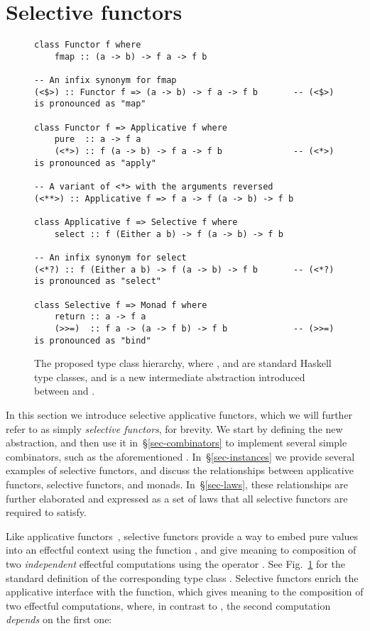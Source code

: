 \section{Selective functors}\label{sec-selective}

\begin{figure}
\begin{verbatim}
class Functor f where
    fmap :: (a -> b) -> f a -> f b

-- An infix synonym for fmap
(<$>) :: Functor f => (a -> b) -> f a -> f b       -- (<$>) is pronounced as "map"

class Functor f => Applicative f where
    pure  :: a -> f a
    (<*>) :: f (a -> b) -> f a -> f b              -- (<*>) is pronounced as "apply"

-- A variant of <*> with the arguments reversed
(<**>) :: Applicative f => f a -> f (a -> b) -> f b

class Applicative f => Selective f where
    select :: f (Either a b) -> f (a -> b) -> f b

-- An infix synonym for select
(<*?) :: f (Either a b) -> f (a -> b) -> f b       -- (<*?) is pronounced as "select"

class Selective f => Monad f where
    return :: a -> f a
    (>>=)  :: f a -> (a -> f b) -> f b             -- (>>=) is pronounced as "bind"
\end{verbatim}
\caption{The proposed type class hierarchy, where , 
and  are standard Haskell type classes, and  is
a new intermediate abstraction introduced between  and
.}\label{fig-types}
\end{figure}

In this section we introduce selective applicative functors, which we will
further refer to as simply \emph{selective functors}, for brevity. We start by
defining the new abstraction, and then use it in~\S\ref{sec-combinators} to
implement several simple combinators, such as the aforementioned .
In~\S\ref{sec-instances} we provide several examples of selective functors, and
discuss the relationships between applicative functors, selective functors, and
monads. In~\S\ref{sec-laws}, these relationships are further elaborated and
expressed as a set of laws that all selective functors are required to satisfy.

Like applicative functors~\citep{mcbride2008applicative}, selective functors
provide a way to embed pure values into an effectful context  using the
function , and give meaning to composition of two \emph{independent}
effectful computations using the operator \hs{<*>}. See Fig.~\ref{fig-types} for
the standard definition of the corresponding type class .
Selective functors enrich the applicative interface with the 
function, which gives meaning to the composition of two effectful computations,
where, in contrast to \hs{<*>}, the second computation \emph{depends} on the
first one:

